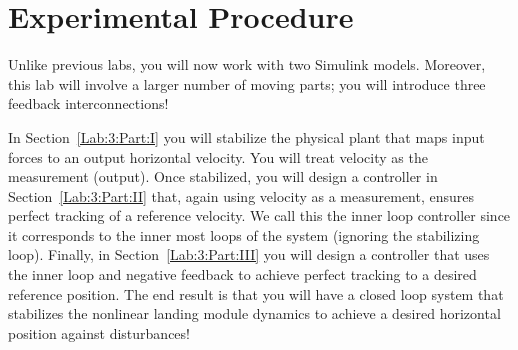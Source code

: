 \section{Experimental Procedure}\label{Lab:3:Experiment}
Unlike previous labs, you will now work with two Simulink models.
Moreover, this lab will involve a larger number of moving parts;
you will introduce three feedback interconnections!

In Section~\ref{Lab:3:Part:I} you will stabilize the physical plant that maps input forces to an output horizontal velocity.
You will treat velocity as the measurement (output).
Once stabilized, you will design a controller in Section~\ref{Lab:3:Part:II} that, again using velocity as a measurement, ensures perfect tracking of a reference velocity.
We call this the inner loop controller since it corresponds to the inner most loops of the system (ignoring the stabilizing loop).
Finally, in Section~\ref{Lab:3:Part:III} you will design a controller that uses the inner loop and negative feedback to achieve perfect tracking to a desired reference position.
The end result is that you will have a closed loop system that stabilizes the nonlinear landing module dynamics to achieve a desired horizontal position against disturbances!


